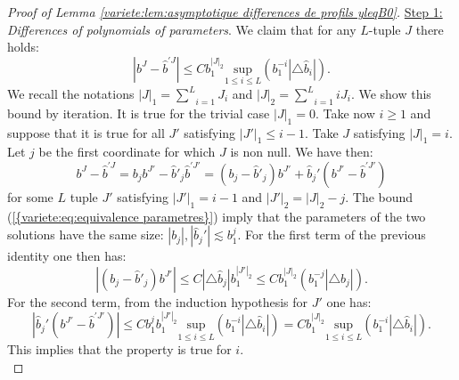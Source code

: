 \documentclass[11pt,a4paper,reqno]{amsart}
\theoremstyle{remark}
\numberwithin{equation}{section}
\begin{document}
\begin{proof}[Proof of Lemma \ref{variete:lem:asymptotique differences de profils yleqB0}]
\underline{Step 1:} \emph{Differences of polynomials of parameters}. We claim that for any $L$-tuple $J$ there holds:
\begin{equation} \label{variete:eq:difference polynomes parametres}
|b^J-\hat{b}^{'J}|\leq C b_1^{|J|_2}\underset{1\leq i \leq L}{\text{sup}}(b_1^{-i}|\triangle \hat{b}_i|).
\end{equation}
We recall the notations $|J|_1=\underset{i=1}{\overset{L}{\sum}}J_i$ and $|J|_2=\underset{i=1}{\overset{L}{\sum}}iJ_i$. We show this bound by iteration. It is true for the trivial case $|J|_1=0$. Take now $i\geq 1$ and suppose that it is true for all $J'$ satisfying $|J'|_1\leq i-1$. Take $J$ satisfying $|J|_1=i$. Let $j$ be the first coordinate for which $J$ is non null. We have then:
$$
b^J-\hat{b}^{'J}=b_jb^{J'}-\hat{b}'_j\hat{b}^{'J'}=(b_j-\hat{b}'_j)b^{J'}+\hat{b}_j'(b^{J'}-\hat{b}^{'J'})
$$
for some $L$ tuple $J'$ satisfying $|J'|_1=i-1$ and $|J'|_2=|J|_2-j$. The bound {{\rm (\ref{{variete:eq:equivalence parametres}})}} imply that the parameters of the two solutions have the same size: $|b_j|,|\hat{b}_j'|\lesssim b_1^j$. For the first term of the previous identity one then has:
$$
|(b_j-\hat{b}'_j)b^{J'}|\leq C|\triangle \hat{b}_j|b_1^{|J'|_2}\leq C b_1^{|J|_2}(b_1^{-j}|\triangle \hat{b}_j|).
$$
For the second term, from the induction hypothesis for $J'$ one has:
$$
|\hat{b}_j'(b^{J'}-\hat{b}^{'J'})|\leq C b_1^jb_1^{|J'|_2}\underset{1\leq i \leq L}{\text{sup}}(b_1^{-i}|\triangle \hat{b}_i|)= C b_1^{|J|_2}\underset{1\leq i \leq L}{\text{sup}}(b_1^{-i}|\triangle \hat{b}_i|).
$$
This implies that the property is true for $i$.\\


\end{proof}
\end{document}
